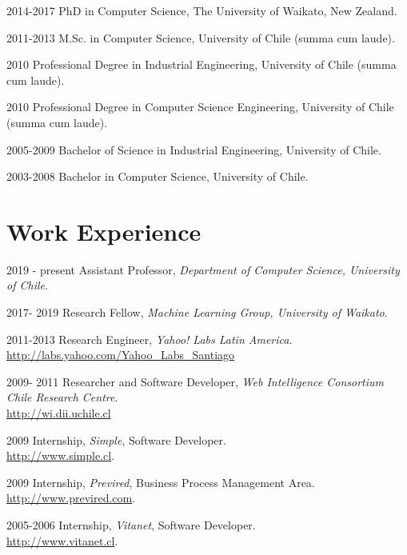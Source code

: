 \documentclass[letterpaper]{article}
\begin{document}
\begin{CV}


\item[2014-2017] PhD in Computer Science, The University of Waikato, New Zealand.

\item[2011-2013] M.Sc. in Computer Science, University of Chile (summa cum laude).

\item[2010] Professional Degree in Industrial Engineering, University of Chile (summa cum laude).

\item[2010] Professional Degree in Computer Science Engineering, University of Chile (summa cum laude).

\item[2005-2009]  Bachelor of Science in Industrial Engineering, University of Chile.

\item[2003-2008]  Bachelor in Computer Science, University of Chile.



\end{CV}




\section{Work Experience}

\begin{CV}

\item[2019 - present] Assistant Professor, \textit{Department of Computer Science, University of Chile}.  \\
\item[2017- 2019] Research Fellow, \textit{Machine Learning Group, University of Waikato}. \\
\item[2011-2013] Research Engineer, \textit{Yahoo! Labs Latin America}. \\ \url{http://labs.yahoo.com/Yahoo_Labs_Santiago} 
\item[2009- 2011] Researcher and Software Developer, \textit{Web Intelligence Consortium Chile Research Centre}.    \\ \url{http://wi.dii.uchile.cl}
\item[2009] Internship, \textit{Simple}, Software Developer. \\ \url{http://www.simple.cl}.
\item[2009] Internship, \textit{Previred}, Business Process Management Area. \\ \url{http://www.previred.com}.
\item[2005-2006] Internship, \textit{Vitanet}, Software Developer. \\ \url{http://www.vitanet.cl}. 

\end{CV}
\end{document}
